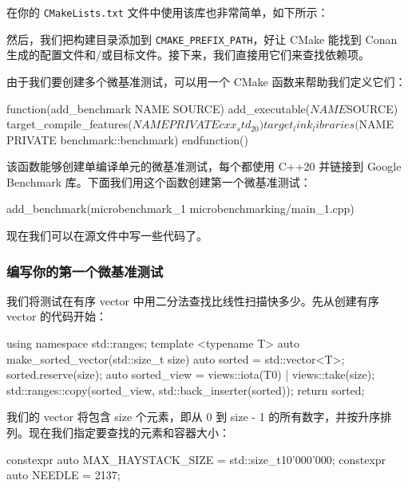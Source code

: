 在你的 \texttt{CMake\allowbreak{}Lists.\allowbreak{}txt} 文件中使用该库也非常简单，如下所示：


然后，我们把构建目录添加到 \texttt{CMAKE\_\allowbreak{}PREFIX\_\allowbreak{}PATH}，好让 CMake 能找到 Conan 生成的配置文件和/或目标文件。接下来，我们直接用它们来查找依赖项。

由于我们要创建多个微基准测试，可以用一个 CMake 函数来帮助我们定义它们：

\begin{codebox}[cmake]
function(add_benchmark NAME SOURCE)
  add_executable(${NAME} ${SOURCE})
  target_compile_features(${NAME} PRIVATE cxx_std_20)
  target_link_libraries(${NAME} PRIVATE benchmark::benchmark)
endfunction()
\end{codebox}

\label{idx:1164}
该函数能够创建单编译单元的微基准测试，每个都使用 C++20 并链接到 Google Benchmark 库。下面我们用这个函数创建第一个微基准测试：

\begin{codebox}[text]
add_benchmark(microbenchmark_1 microbenchmarking/main_1.cpp)
\end{codebox}

现在我们可以在源文件中写一些代码了。

\subsubsection{编写你的第一个微基准测试}

\label{idx:1165}
我们将测试在有序 vector 中用二分法查找比线性扫描快多少。先从创建有序 vector 的代码开始：

\begin{codebox}[cpp]
using namespace std::ranges;
template <typename T>
auto make_sorted_vector(std::size_t size) {
  auto sorted = std::vector<T>{};
  sorted.reserve(size);
  auto sorted_view = views::iota(T{0}) | views::take(size);
  std::ranges::copy(sorted_view, std::back_inserter(sorted));
  return sorted;
}
\end{codebox}

我们的 vector 将包含 size 个元素，即从 0 到 size - 1 的所有数字，并按升序排列。现在我们指定要查找的元素和容器大小：

\begin{codebox}[cpp]
constexpr auto MAX_HAYSTACK_SIZE = std::size_t{10'000'000};
constexpr auto NEEDLE = 2137;
\end{codebox}

